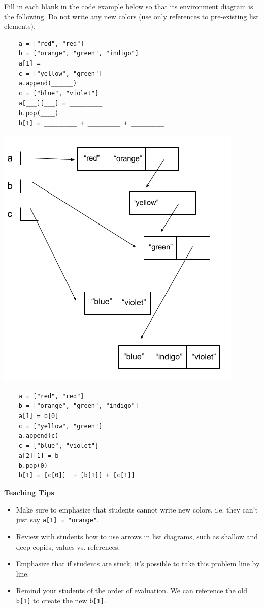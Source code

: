 \begin{blocksection}
    \question Fill in each blank in the code example below so that its environment diagram is the following. Do not write any new colors (use only references to pre-existing list elements).
    
    \begin{multicols}{2}
    \begin{lstlisting}
    a = ["red", "red"]
    b = ["orange", "green", "indigo"]
    a[1] = ________
    c = ["yellow", "green"]
    a.append(______)
    c = ["blue", "violet"]
    a[___][___] = _________
    b.pop(____)
    b[1] = _________ + _________ + _________
    \end{lstlisting}
    
    \columnbreak
    \includegraphics[width=.45\textwidth]{rainbow_connection.png}
    \end{multicols}
    
\begin{solution}[2in]
    \begin{lstlisting}
    a = ["red", "red"]
    b = ["orange", "green", "indigo"]
    a[1] = b[0]
    c = ["yellow", "green"]
    a.append(c)
    c = ["blue", "violet"]
    a[2][1] = b
    b.pop(0)
    b[1] = [c[0]]  + [b[1]] + [c[1]]
    \end{lstlisting}
\end{solution}

\begin{guide}
    \textbf{Teaching Tips}
    \begin{itemize}
        \item Make sure to emphasize that students cannot write new colors, i.e. they can't just say \lstinline{a[1] = "orange"}.
        \item Review with students how to use arrows in list diagrams, such as shallow and deep copies, values vs. references.
        \item Emphasize that if students are stuck, it's possible to take this problem line by line.
        \item Remind your students of the order of evaluation. We can reference the old \lstinline{b[1]} to create the new \lstinline{b[1]}.
    \end{itemize}
\end{guide}
\end{blocksection}
    